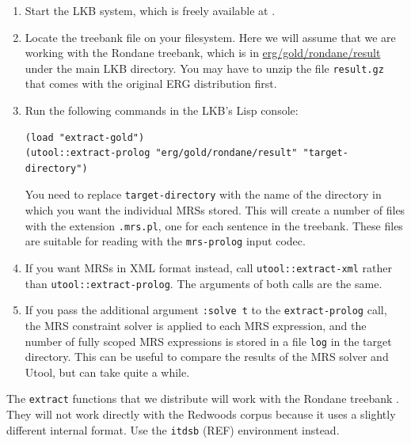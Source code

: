 \begin{enumerate}
\item Start the LKB system, which is freely available at .
\item Locate the treebank file on your filesystem. Here we will assume
that we are working with the Rondane treebank, which is in
\url{erg/gold/rondane/result} under the main LKB directory. You may
have to unzip the file \verb?result.gz? that comes with the original
ERG distribution first.
\item Run the following commands in the LKB's Lisp console:
\begin{verbatim}
(load "extract-gold")
(utool::extract-prolog "erg/gold/rondane/result" "target-directory")
\end{verbatim}
You need to replace \verb?target-directory? with the name of the
directory in which you want the individual MRSs stored. This will
create a number of files with the extension \verb?.mrs.pl?, one for
each sentence in the treebank. These files are suitable for reading
with the \verb?mrs-prolog? input codec.
\item If you want MRSs in XML format instead, call
\verb?utool::extract-xml? rather than
\verb?utool::extract-prolog?. The arguments of both calls are the
same. 
\item If you pass the additional argument \verb?:solve t? to the
\verb?extract-prolog? call, the MRS constraint solver is applied to
each MRS expression, and the number of fully scoped MRS expressions is
stored in a file \verb|log| in the target directory. This can be
useful to compare the results of the MRS solver and Utool, but can
take quite a while.
\end{enumerate}

The \verb?extract? functions that we distribute will work with the
Rondane treebank . They will not work directly with
the Redwoods corpus \cite{Oepen&al:Redwoods} because it uses a
slightly different internal format. Use the \texttt{itdsb} (REF)
environment instead.




